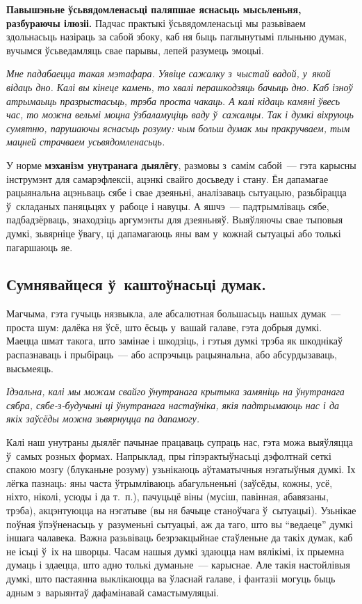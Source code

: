 \textbf{Павышэньне ўсьвядомленасьці паляпшае яснасьць мысьленьня, разбураючы ілюзіі.} Падчас практыкі ўсьвядомленасьці мы разьвіваем здольнасьць назіраць за сабой збоку, каб ня быць паглынутымі плыньню думак, вучымся ўсьведамляць свае парывы, лепей разумець эмоцыі.

\emph{Мне падабаецца такая мэтафара. Уявіце сажалку з~чыстай вадой, у~якой відаць дно. Калі вы кінеце камень, то хвалі перашкодзяць бачыць дно. Каб ізноў атрымаыць празрыстасьць, трэба проста чакаць. А калі кідаць камяні ўвесь час, то можна вельмі моцна ўзбаламуціць ваду ў~сажалцы. Так і думкі віхруюць сумятню, парушаючы яснасьць розуму: чым больш думак мы пракручваем, тым мацней страчваем усьвядомленасьць.}

У норме \textbf{мэханізм унутранага дыялёгу}, размовы з~самім сабой~--- гэта карысны інструмэнт для самарэфлексіі, ацэнкі свайго досьведу і стану. Ён дапамагае рацыянальна ацэньваць сябе і свае дзеяньні, аналізаваць сытуацыю, разьбірацца ў~складаных паняцьцях у~рабоце і навуцы. А яшчэ~--- падтрымліваць сябе, падбадзёрваць, знаходзіць аргумэнты для дзеяньняў. Выяўляючы свае тыповыя думкі, зьвярніце ўвагу, ці дапамагаюць яны вам у~кожнай сытуацыі або толькі пагаршаюць яе.

\subsection*{Сумнявайцеся ў~каштоўнасьці думак.}

Магчыма, гэта гучыць нязвыкла, але абсалютная большасьць нашых думак~--- проста шум: далёка ня ўсё, што ёсьць у~вашай галаве, гэта добрыя думкі. Маецца шмат такога, што замінае і шкодзіць, і гэтыя думкі трэба як шкоднікаў распазнаваць і прыбіраць~--- або аспрэчыць рацыянальна, або абсурдызаваць, высьмеяць.

\emph{Ідэальна, калі мы можам свайго ўнутранага крытыка замяніць на ўнутранага сябра, сябе-з-будучыні ці ўнутранага настаўніка, якія падтрымаюць нас і да якіх заўсёды можна зьвярнуцца па дапамогу.}

Калі наш унутраны дыялёг пачынае працаваць супраць нас, гэта можа выяўляцца ў~самых розных формах. Напрыклад, пры гіпэрактыўнасьці дэфолтнай сеткі спакою мозгу (блуканьне розуму) узьнікаюць аўтаматычныя нэгатыўныя думкі. Іх лёгка пазнаць: яны часта ўтрымліваюць абагульненьні (заўсёды, кожны, усё, ніхто, ніколі, усюды і да т.~п.), пачуцьцё віны (мусіш, павінная, абавязаны, трэба), акцэнтуюцца на нэгатыве (вы ня бачыце станоўчага ў~сытуацыі). Узьнікае поўная ўпэўненасьць у~разуменьні сытуацыі, аж да таго, што вы ``ведаеце'' думкі іншага чалавека. Важна разьвіваць безрэакцыйнае стаўленьне да такіх думак, каб не ісьці ў~іх на шворцы. Часам нашыя думкі здаюцца нам вялікімі, іх прыемна думаць і здаецца, што адно толькі думаньне~--- карыснае. Але такія настойлівыя думкі, што пастаянна выклікаюцца ва ўласнай галаве, і фантазіі могуць быць адным з~варыянтаў дафамінавай самастымуляцыі. 

